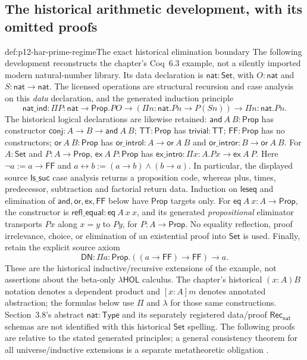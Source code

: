 \subsection{The historical arithmetic development, with its omitted proofs}

\begin{hbdefinition}{def:p12-har-prime-regime}{The exact historical elimination boundary}
The following development reconstructs the chapter's Coq~6.3 example,
not a silently imported modern natural-number library. Its data declaration
is \(\mathsf{nat}:\mathsf{Set}\), with \(O:\mathsf{nat}\) and
\(S:\mathsf{nat}\to\mathsf{nat}\). The licensed operations are
structural recursion and case analysis on this \emph{data} declaration,
and the generated induction principle
\[
 \mathsf{nat\_ind}:\Pi P:\mathsf{nat}\to\mathsf{Prop}.
 P O\to(\Pi n:\mathsf{nat}.P n\to P(S n))\to
 \Pi n:\mathsf{nat}.P n.
\]
The historical logical declarations are likewise retained:
\(\mathsf{and}\ A\ B:\mathsf{Prop}\) has constructor
\(\mathsf{conj}:A\to B\to\mathsf{and}\ A\ B\);
\(\mathsf{TT}:\mathsf{Prop}\) has \(\mathsf{trivial}:\mathsf{TT}\);
\(\mathsf{FF}:\mathsf{Prop}\) has no constructors;
\(\mathsf{or}\ A\ B:\mathsf{Prop}\) has
\(\mathsf{or\_introl}:A\to\mathsf{or}\ A\ B\) and
\(\mathsf{or\_intror}:B\to\mathsf{or}\ A\ B\).
For \(A:\mathsf{Set}\) and \(P:A\to\mathsf{Prop}\),
\(\mathsf{ex}\ A\ P:\mathsf{Prop}\) has
\(\mathsf{ex\_intro}:\Pi x:A.P x\to\mathsf{ex}\ A\ P\).
Here \(\neg a:=a\to\mathsf{FF}\) and
\(a\leftrightarrow b:=(a\to b)\wedge(b\to a)\).
In particular, the displayed source \(\mathsf{Is\_suc}\) case analysis
returns a proposition code, whereas plus, times, predecessor, subtraction
and factorial return data. Induction on \(\mathsf{leseq}\) and elimination
of \(\mathsf{and},\mathsf{or},\mathsf{ex},\mathsf{FF}\) below have
\(\mathsf{Prop}\) targets only. For
\(\mathsf{eq}\ A\ x:\!A\to\mathsf{Prop}\), the constructor is
\(\mathsf{refl\_equal}:\mathsf{eq}\ A\ x\ x\), and its generated
\emph{propositional} eliminator transports \(P x\) along \(x=y\) to
\(P y\), for \(P:A\to\mathsf{Prop}\). No equality reflection,
proof irrelevance, choice, or elimination of an existential proof into
\(\mathsf{Set}\) is used. Finally, retain the explicit source axiom
\[
 \mathsf{DN}:\Pi a:\mathsf{Prop}.((a\to\mathsf{FF})\to\mathsf{FF})\to a.
\]
These are the historical inductive/recursive extensions of the example,
not assertions about the beta-only \(\lambda\mathsf{HOL}\) calculus.
The chapter's historical \((x:A)B\) notation denotes a dependent
product and \([x:A]m\) denotes annotated abstraction; the formulas
below use \(\Pi\) and \(\lambda\) for those same constructions.
Section~3.8's abstract \(\mathsf{nat}:\mathsf{Type}\) and its separately
registered data/proof \(\mathsf{Rec}_{\mathsf{nat}}\) schemas are not
identified with this historical \(\mathsf{Set}\) spelling. The following
proofs are relative to the stated generated principles; a general
consistency theorem for all universe/inductive extensions is a separate
metatheoretic obligation \cite[pp.~1214--1220]{BarendregtGeuvers2001}.
\end{hbdefinition}

